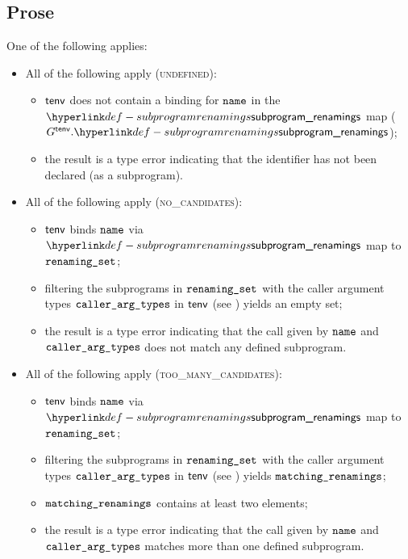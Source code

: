 \documentclass{book}
\newcommand\ProseOrTypeError[0]{\ProseTerminateAs{\TypeErrorConfig}}
\begin{document}
\subsection{Prose}
One of the following applies:
\begin{itemize}
  \item All of the following apply (\textsc{undefined}):
  \begin{itemize}
    \item $\textsf{tenv}$ does not contain a binding for $\texttt{name}$ in the $\subprogramrenamings$ map
          ($G^\tenv.\subprogramrenamings$);
    \item the result is a type error indicating that the identifier has not been declared (as a subprogram).
  \end{itemize}

  \item All of the following apply (\textsc{no\_candidates}):
  \begin{itemize}
    \item $\textsf{tenv}$ binds $\texttt{name}$ via $\subprogramrenamings$ map to $\texttt{renaming\_set}$;
    \item filtering the subprograms in $\texttt{renaming\_set}$ with the caller argument types $\texttt{caller\_arg\_types}$
          in $\textsf{tenv}$ (see ) yields an empty set\ProseOrTypeError;
    \item the result is a type error indicating that the call given by $\texttt{name}$ and \\ $\texttt{caller\_arg\_types}$
          does not match any defined subprogram.
  \end{itemize}

  \item All of the following apply (\textsc{too\_many\_candidates}):
  \begin{itemize}
    \item $\textsf{tenv}$ binds $\texttt{name}$ via $\subprogramrenamings$ map to $\texttt{renaming\_set}$;
    \item filtering the subprograms in $\texttt{renaming\_set}$ with the caller argument types $\texttt{caller\_arg\_types}$
          in $\textsf{tenv}$ (see ) yields $\texttt{matching\_renamings}$\ProseOrTypeError;
    \item $\texttt{matching\_renamings}$ contains at least two elements;
    \item the result is a type error indicating that the call given by $\texttt{name}$ and \\
          $\texttt{caller\_arg\_types}$ matches more than one defined subprogram.
  \end{itemize}


\end{itemize}
\end{document}
